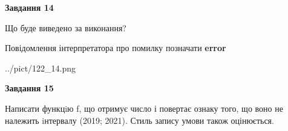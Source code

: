 \documentclass[11pt, ukrainian]{article}
\begin{document}
{\begin {large}
{\begin {center}\textbf{Завдання 14}\end {center}}\par
Що буде виведено за виконання? \par
Повідомлення інтерпретатора про помилку позначати \textbf{error}

\begin{center}
	{../pict/122_14.png}
\end{center}
\newpage

{\begin {center}\textbf{Завдання 15}\end {center}}\par

Написати функцiю f, що отримує число і повертає ознаку того, що воно не належить iнтервалу (2019; 2021). Стиль запису умови також оцінюється.\par
\newpage

\end {large}}
\end{document}
